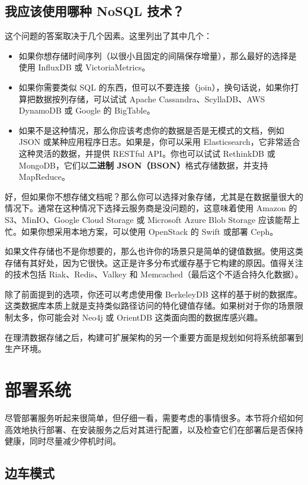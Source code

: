 \subsection{我应该使用哪种 NoSQL 技术？}

这个问题的答案取决于几个因素。这里列出了其中几个：

\begin{itemize}
\label{idx:399}
\item 如果你想存储时间序列（以很小且固定的间隔保存增量），那么最好的选择是使用 InfluxDB 或 VictoriaMetrics。
\item 如果你需要类似 SQL 的东西，但可以不要连接（join），换句话说，如果你打算把数据按列存储，可以试试 Apache Cassandra、ScyllaDB、AWS DynamoDB 或 Google 的 BigTable。
\label{idx:400}
\item 如果不是这种情况，那么你应该考虑你的数据是否是无模式的文档，例如 JSON 或某种应用程序日志。如果是，你可以采用 Elasticsearch，它非常适合这种灵活的数据，并提供 RESTful API。你也可以试试 RethinkDB 或 MongoDB，它们以\textbf{二进制 JSON（BSON）}格式存储数据，并支持 MapReduce。
\end{itemize}

好，但如果你不想存储文档呢？那么你可以选择对象存储，尤其是在数据量很大的情况下。通常在这种情况下选择云服务商是没问题的，这意味着使用 Amazon 的 S3、MinIO、Google Cloud Storage 或 Microsoft Azure Blob Storage 应该能帮上忙。如果你想采用本地方案，可以使用 OpenStack 的 Swift 或部署 Ceph。

如果文件存储也不是你想要的，那么也许你的场景只是简单的键值数据。使用这类存储有其好处，因为它很快。这正是许多分布式缓存基于它构建的原因。值得关注的技术包括 Riak、Redis、Valkey 和 Memcached（最后这个不适合持久化数据）。

除了前面提到的选项，你还可以考虑使用像 BerkeleyDB 这样的基于树的数据库。这类数据库本质上就是支持类似路径访问的特化键值存储。如果树对于你的场景限制太多，你可能会对 Neo4j 或 OrientDB 这类面向图的数据库感兴趣。

在理清数据存储之后，构建可扩展架构的另一个重要方面是规划如何将系统部署到生产环境。

\section{部署系统}

\label{idx:401}
尽管部署服务听起来很简单，但仔细一看，需要考虑的事情很多。本节将介绍如何高效地执行部署、在安装服务之后对其进行配置，以及检查它们在部署后是否保持健康，同时尽量减少停机时间。

\subsection{边车模式}

